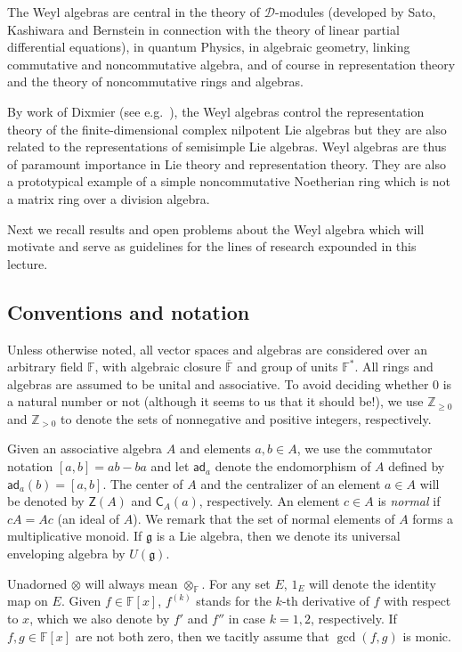 \documentclass{commat}
\newcommand{\FF}{\mathbb{F}}
\newcommand{\ZZ}{\mathbb{Z}}
\newcommand\ot{\otimes}
\newcommand{\barr}[1]{\overline{#1}}
\newcommand{\g}{\mathfrak g}
\newcommand\ad{\mathsf{ad}}
\begin{document}
The Weyl algebras are central in the theory of $\mathcal D$-modules (developed by Sato, Kashiwara and Bernstein in connection with the theory of linear partial differential equations), in quantum Physics, in algebraic geometry, linking commutative and noncommutative algebra, and of course in representation theory and the theory of noncommutative rings and algebras. 

By work of Dixmier (see e.g.\ \cite[Thm.\ 4.7.9]{jD96}), the Weyl algebras control the representation theory of the finite-dimensional complex nilpotent Lie algebras but they are also related to the representations of semisimple Lie algebras. Weyl algebras are thus of paramount importance in Lie theory and representation theory. They are also a prototypical example of a simple noncommutative Noetherian ring which is not a matrix ring over a division algebra.

Next we recall results and open problems about the Weyl algebra which will motivate and serve as guidelines for the lines of research expounded in this lecture.

\subsection{Conventions and notation}\label{SS:intro:cn}

Unless otherwise noted, all vector spaces and algebras are considered over an arbitrary field $\FF$, with algebraic closure $\barr \FF$ and group of units $\FF^*$. All rings and algebras are assumed to be unital and associative. To avoid deciding whether $0$ is a natural number or not (although it seems to us that it should be!), we use $\ZZ_{\geq 0}$ and $\ZZ_{> 0}$ to denote the sets of nonnegative and positive integers, respectively.

Given an associative algebra $A$ and elements $a,b \in A$, we use the commutator notation $[a,b]=ab-ba$ and let $\ad_a$ denote the endomorphism of $A$ defined by $\ad_a(b)=[a,b]$. The center of $A$ and the centralizer of an element $a\in A$ will be denoted by $\mathsf{Z}(A)$ and $\mathsf{C}_{A}(a)$, respectively. An element $c\in A$ is \textit{normal} if $cA=Ac$ (an ideal of $A$). We remark that the set of normal elements of $A$ forms a multiplicative monoid. If $\g$ is a Lie algebra, then we denote its universal enveloping algebra by $U(\g)$.

Unadorned $\ot$ will always mean $\ot_\FF$. For any set $E$, $1_E$ will denote the identity map on $E$.
Given  $f\in\FF[x]$, 
$f^{(k)}$ stands for the $k$-th derivative of $f$ with respect to $x$, which we also denote by $f'$ and $f''$ in case $k=1, 2$, respectively. If $f, g\in\FF[x]$ are not both zero, then we tacitly assume that $\gcd(f, g)$ is monic.
\end{document}
